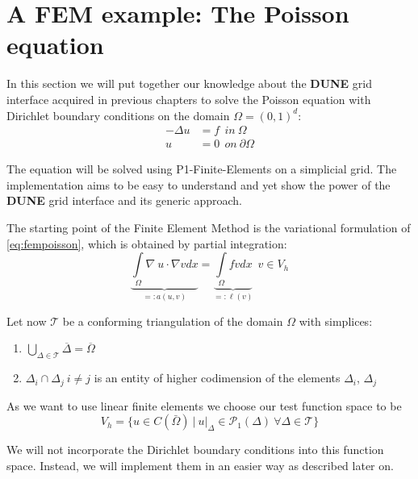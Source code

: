 \documentclass[11pt,a4paper,headinclude,footinclude,DIV16,normalheadings]{scrreprt}
\newcommand{\Dune}{{\sf\bfseries DUNE}\xspace}
\begin{document}
\section{A FEM example: The Poisson equation}
\label{Sec:FEMPoisson}

In this section we will put together our knowledge about the \Dune{} grid interface acquired in previous chapters to solve the Poisson equation with Dirichlet boundary conditions on the domain $\Omega = (0,1)^d$:
\begin{align} \label{eq:fempoisson}
 -\Delta u & = f \ \ in \ \Omega\\
u & = 0 \ \ on \ \partial\Omega
\end{align}

The equation will be solved using P1-Finite-Elements on a simplicial grid. The implementation aims to be easy to understand and yet show the power of the \Dune{} grid interface and its generic approach.

The starting point of the Finite Element Method is the variational formulation of \ref{eq:fempoisson}, which is obtained by partial integration:
\begin{equation}
\underbrace{\int\limits_{\Omega}\nabla\ u\cdot\nabla v dx}_{ =:a(u,v)}
= \underbrace{\int\limits_{\Omega} fv dx}_{=:\ell (v)} \ \ v\in V_h
\end{equation}

Let now $\mathcal{T}$ be a conforming triangulation of the domain $\Omega$ with simplices:
\renewcommand{\labelenumi}{(\roman{enumi})}
\begin{center}
\begin{enumerate}
 \item $\bigcup\limits_{\Delta\in\mathcal{T}} \overline{\Delta} = \overline{\Omega}$
 \item $\Delta_i\cap\Delta_j \ i\neq j$ is an entity of 
higher codimension of the elements $\Delta_i$, $\Delta_j$
\end{enumerate}
\end{center}

As we want to use linear finite elements we choose our test function space to be
\begin{equation}
 V_h = \{ u\in C(\bar{\Omega} )\ \Big| \ u\big|_{\Delta}\in\mathcal{P}_1 (\Delta ) \ \forall\Delta\in\mathcal{T}\}
\end{equation}

We will not incorporate the Dirichlet boundary conditions into this function space. Instead, we will implement them in an easier way as described later on.
\end{document}

